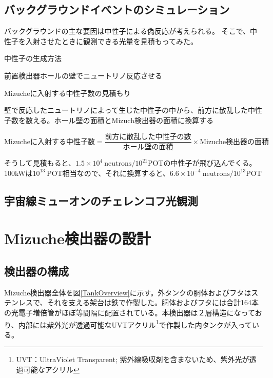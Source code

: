 \documentclass[11pt]{ltjsreport}
\newcommand{\figref}[1]{図\ref{#1}}
\begin{document}
\section{バックグラウンドイベントのシミュレーション}

バックグラウンドの主な要因は中性子による偽反応が考えられる。
そこで、中性子を入射させたときに観測できる光量を見積もってみた。

中性子の生成方法

前置検出器ホールの壁でニュートリノ反応させる

Mizucheに入射する中性子数の見積もり

壁で反応したニュートリノによって生じた中性子の中から、前方に散乱した中性子数を数える。ホール壁の面積とMizuch検出器の面積に換算する

\begin{equation}
\text{Mizucheに入射する中性子数} = \frac{\text{前方に散乱した中性子の数}}{\text{ホール壁の面積}} \times \text{Mizuche検出器の面積}
\end{equation}

そうして見積もると、$1.5\times10^{4}\ \mathrm{neutrons/10^{21}POT}$の中性子が飛び込んでくる。100kWは$10^{13}\ \mathrm{POT}$相当なので、それに換算すると、$6.6\times 10^{-4}\ \mathrm{neutrons/10^{13}POT}$


\section{宇宙線ミューオンのチェレンコフ光観測}
\fi%

\chapter{Mizuche検出器の設計}
\section{検出器の構成}
Mizuche検出器全体を\figref{TankOverview}に示す。外タンクの胴体およびフタはステンレスで、それを支える架台は鉄で作製した。胴体およびフタには合計164本の光電子増倍管がほぼ等間隔に配置されている。本検出器は２層構造になっており、内部には紫外光が透過可能なUVTアクリル\footnote{UVT：UltraViolet Transparent; 紫外線吸収剤を含まないため、紫外光が透過可能なアクリル}で作製した内タンクが入っている。
\end{document}
